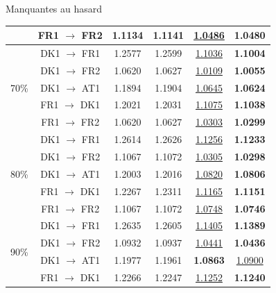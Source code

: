 \documentclass{beamer}
\begin{document}
\begin{frame}{Manquantes au hasard}
\begin{center}
{\begin{minipage}{1.2\linewidth}
\begin{table}[H]
\begin{tabular}{| c | c | c | c | c | c |}
                                                & FR1 $\rightarrow$ FR2 & 1.1134 & 1.1141 & \underline{1.0486} & \textbf{1.0480} \\
                        \hline 
                        \multirow{5}{4em}{70\%} & DK1 $\rightarrow$ FR1 & 1.2577 & 1.2599 & \underline{1.1036} & \textbf{1.1004} \\
                                                & DK1 $\rightarrow$ FR2 & 1.0620 & 1.0627 & \underline{1.0109} & \textbf{1.0055} \\
                                                & DK1 $\rightarrow$ AT1 & 1.1894 & 1.1904 & \underline{1.0645} & \textbf{1.0624} \\
                                                & FR1 $\rightarrow$ DK1 & 1.2021 & 1.2031 & \underline{1.1075} & \textbf{1.1038} \\
                                                & FR1 $\rightarrow$ FR2 & 1.0620 & 1.0627 & \underline{1.0303} & \textbf{1.0299} \\
                        \hline 
                        \multirow{5}{4em}{80\%} & DK1 $\rightarrow$ FR1 & 1.2614 & 1.2626 & \underline{1.1256} & \textbf{1.1233} \\
                                                & DK1 $\rightarrow$ FR2 & 1.1067 & 1.1072 & \underline{1.0305} & \textbf{1.0298} \\
                                                & DK1 $\rightarrow$ AT1 & 1.2003 & 1.2016 & \underline{1.0820} & \textbf{1.0806} \\
                                                & FR1 $\rightarrow$ DK1 & 1.2267 & 1.2311 & \underline{1.1165} & \textbf{1.1151} \\
                                                & FR1 $\rightarrow$ FR2 & 1.1067 & 1.1072 & \underline{1.0748} & \textbf{1.0746} \\
                        \hline
                        \multirow{5}{4em}{90\%} & DK1 $\rightarrow$ FR1 & 1.2635 & 1.2605 & \underline{1.1405} & \textbf{1.1389} \\
                                                & DK1 $\rightarrow$ FR2 & 1.0932 & 1.0937 & \underline{1.0441} & \textbf{1.0436} \\
                                                & DK1 $\rightarrow$ AT1 & 1.1977 & 1.1961 & \textbf{1.0863} & \underline{1.0900} \\
                                                & FR1 $\rightarrow$ DK1 & 1.2266 & 1.2247 & \underline{1.1252} & \textbf{1.1240} \\

\end{tabular}
\end{table}
\end{minipage}}
\end{center}
\end{frame}
\end{document}
